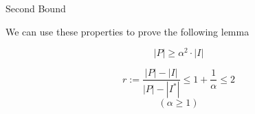 \begin{frame}{Second Bound}

We can use these properties to prove the following lemma 

\begin{lemma}
$$ |P| \geq \alpha^2 \cdot |I| $$
\end{lemma}

\pause\begin{corollary}
$$ r := \frac{|P| - |I|}{|P| - |I^*|} \leq 1 + \frac{1}{\alpha} \leq 2 $$
$$ (\alpha \geq 1)$$
\end{corollary}


\end{frame}

